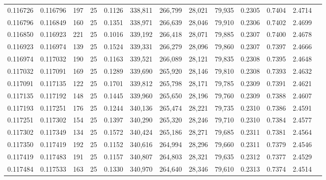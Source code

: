 \begin{tabular}{rrrrrrrrrrrrr}
0.116726 & 0.116796 &   197 &  25 &                                     0.1126 & 338,811 & 266,799 &  28,021 &  79,935 & 0.2305 & 0.7404 & 2.4714 \\
0.116796 & 0.116849 &   160 &  25 &                                     0.1351 & 338,971 & 266,639 &  28,046 &  79,910 & 0.2306 & 0.7402 & 2.4699 \\
0.116850 & 0.116923 &   221 &  25 &                                     0.1016 & 339,192 & 266,418 &  28,071 &  79,885 & 0.2307 & 0.7400 & 2.4678 \\
0.116923 & 0.116974 &   139 &  25 &                                     0.1524 & 339,331 & 266,279 &  28,096 &  79,860 & 0.2307 & 0.7397 & 2.4666 \\
0.116974 & 0.117032 &   190 &  25 &                                     0.1163 & 339,521 & 266,089 &  28,121 &  79,835 & 0.2308 & 0.7395 & 2.4648 \\
0.117032 & 0.117091 &   169 &  25 &                                     0.1289 & 339,690 & 265,920 &  28,146 &  79,810 & 0.2308 & 0.7393 & 2.4632 \\
0.117091 & 0.117135 &   122 &  25 &                                     0.1701 & 339,812 & 265,798 &  28,171 &  79,785 & 0.2309 & 0.7391 & 2.4621 \\
0.117135 & 0.117192 &   148 &  25 &                                     0.1445 & 339,960 & 265,650 &  28,196 &  79,760 & 0.2309 & 0.7388 & 2.4607 \\
0.117193 & 0.117251 &   176 &  25 &                                     0.1244 & 340,136 & 265,474 &  28,221 &  79,735 & 0.2310 & 0.7386 & 2.4591 \\
0.117251 & 0.117302 &   154 &  25 &                                     0.1397 & 340,290 & 265,320 &  28,246 &  79,710 & 0.2310 & 0.7384 & 2.4577 \\
0.117302 & 0.117349 &   134 &  25 &                                     0.1572 & 340,424 & 265,186 &  28,271 &  79,685 & 0.2311 & 0.7381 & 2.4564 \\
0.117350 & 0.117419 &   192 &  25 &                                     0.1152 & 340,616 & 264,994 &  28,296 &  79,660 & 0.2311 & 0.7379 & 2.4546 \\
0.117419 & 0.117483 &   191 &  25 &                                     0.1157 & 340,807 & 264,803 &  28,321 &  79,635 & 0.2312 & 0.7377 & 2.4529 \\
0.117484 & 0.117533 &   163 &  25 &                                     0.1330 & 340,970 & 264,640 &  28,346 &  79,610 & 0.2313 & 0.7374 & 2.4514 \\

\end{tabular}
